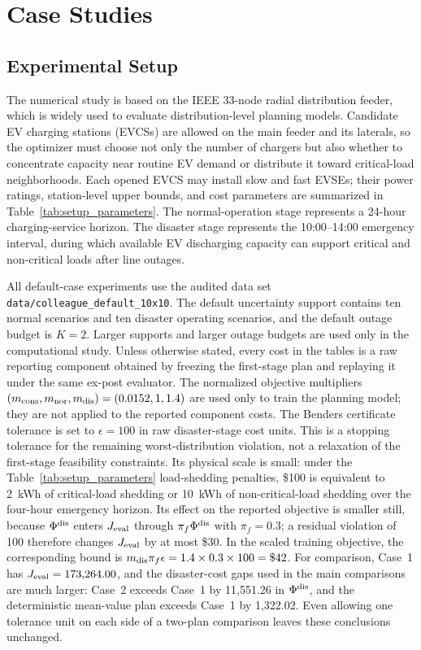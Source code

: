 \section{Case Studies}

\subsection{Experimental Setup}
The numerical study is based on the IEEE 33-node radial distribution feeder,
which is widely used to evaluate distribution-level planning models. Candidate
EV charging stations (EVCSs) are allowed on the main feeder and its laterals,
so the optimizer must choose not only the number of chargers but also whether
to concentrate capacity near routine EV demand or distribute it toward
critical-load neighborhoods. Each opened EVCS may install slow and fast EVSEs;
their power ratings, station-level upper bounds, and cost parameters are
summarized in Table~\ref{tab:setup_parameters}. The normal-operation stage
represents a 24-hour charging-service horizon. The disaster stage represents
the 10:00--14:00 emergency interval, during which available EV discharging
capacity can support critical and non-critical loads after line outages.

All default-case experiments use the audited data set
\texttt{data/colleague\_default\_10x10}. The default uncertainty support
contains ten normal scenarios and ten disaster operating scenarios, and the
default outage budget is $K=2$. Larger supports and larger outage budgets are
used only in the computational study. Unless otherwise stated, every cost in
the tables is a raw reporting component obtained by freezing the first-stage
plan and replaying it under the same ex-post evaluator. The normalized
objective multipliers
$(m_{\rm cons},m_{\rm nor},m_{\rm dis})=(0.0152,1,1.4)$ are used only to train
the planning model; they are not applied to the reported component costs.
The Benders certificate tolerance is set to $\epsilon=100$ in raw
disaster-stage cost units. This is a stopping tolerance for the remaining
worst-distribution violation, not a relaxation of the first-stage feasibility
constraints. Its physical scale is small: under the
Table~\ref{tab:setup_parameters} load-shedding penalties, \$100 is equivalent
to 2~kWh of critical-load shedding or 10~kWh of non-critical-load shedding
over the four-hour emergency horizon. Its effect on the reported objective is
smaller still, because $\Phi^{\rm dis}$ enters $J_{\rm eval}$ through
$\pi_f\Phi^{\rm dis}$ with $\pi_f=0.3$; a residual violation of 100 therefore
changes $J_{\rm eval}$ by at most \$30. In the scaled training objective, the
corresponding bound is
$m_{\rm dis}\pi_f\epsilon=1.4\times0.3\times100=\$42$. For comparison,
Case~1 has $J_{\rm eval}=173{,}264.00$, and the disaster-cost gaps used in
the main comparisons are much larger: Case~2 exceeds Case~1 by 11,551.26 in
$\Phi^{\rm dis}$, and the deterministic mean-value plan exceeds Case~1 by
1,322.02. Even allowing one tolerance unit on each side of a two-plan
comparison leaves these conclusions unchanged.

